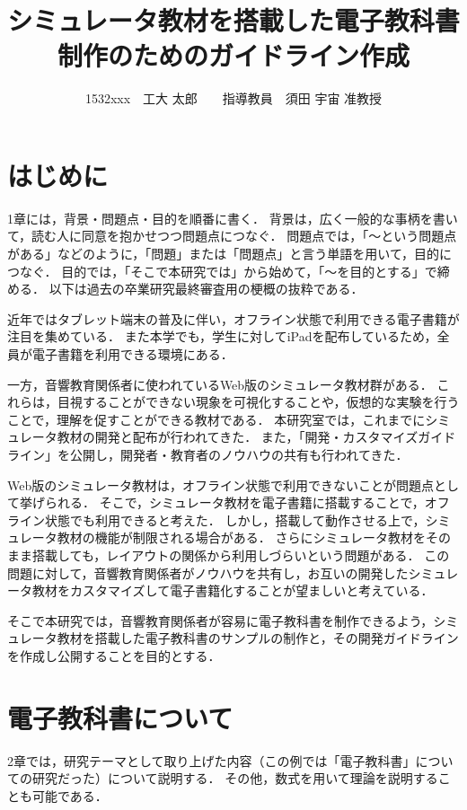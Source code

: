 \documentclass[twocolumn,10pt,a4j]{jsarticle}
\title{シミュレータ教材を搭載した電子教科書制作のためのガイドライン作成}
\author{1532xxx　工大 太郎　　指導教員　須田 宇宙 准教授}
\date{}
\begin{document}
\maketitle

\section{はじめに}
1章には，背景・問題点・目的を順番に書く．
背景は，広く一般的な事柄を書いて，読む人に同意を抱かせつつ問題点につなぐ．
問題点では，「〜という問題点がある」などのように，「問題」または「問題点」と言う単語を用いて，目的につなぐ．
目的では，「そこで本研究では」から始めて，「〜を目的とする」で締める．
以下は過去の卒業研究最終審査用の梗概の抜粋である．


近年ではタブレット端末の普及に伴い，オフライン状態で利用できる電子書籍が注目を集めている．
また本学でも，学生に対してiPadを配布しているため，全員が電子書籍を利用できる環境にある．

一方，音響教育関係者に使われているWeb版のシミュレータ教材群\cite{suda2018}がある．
これらは，目視することができない現象を可視化することや，仮想的な実験を行うことで，理解を促すことができる教材である．
本研究室では，これまでにシミュレータ教材の開発と配布が行われてきた．
また，「開発・カスタマイズガイドライン」を公開し，開発者・教育者のノウハウの共有も行われてきた．

Web版のシミュレータ教材は，オフライン状態で利用できないことが問題点として挙げられる．
そこで，シミュレータ教材を電子書籍に搭載することで，オフライン状態でも利用できると考えた．
しかし，搭載して動作させる上で，シミュレータ教材の機能が制限される場合がある．
さらにシミュレータ教材をそのまま搭載しても，レイアウトの関係から利用しづらいという問題がある．
この問題に対して，音響教育関係者がノウハウを共有し，お互いの開発したシミュレータ教材をカスタマイズして電子書籍化することが望ましいと考えている．

そこで本研究では，音響教育関係者が容易に電子教科書を制作できるよう，シミュレータ教材を搭載した電子教科書のサンプルの制作と，その開発ガイドラインを作成し公開することを目的とする．

\section{電子教科書について}
2章では，研究テーマとして取り上げた内容（この例では「電子教科書」についての研究だった）について説明する．
その他，数式を用いて理論を説明することも可能である．
\end{document}
